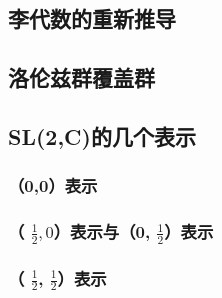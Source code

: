 \subsection{李代数的重新推导}
\subsection{洛伦兹群覆盖群}
\subsection{SL(2,C)的几个表示}
\subsubsection{（0,0）表示}
\subsubsection{（ $\frac{1}{2},0$）表示与（0, $\frac{1}{2}$）表示}
\subsubsection{（ $\frac{1}{2}$, $\frac{1}{2}$）表示}